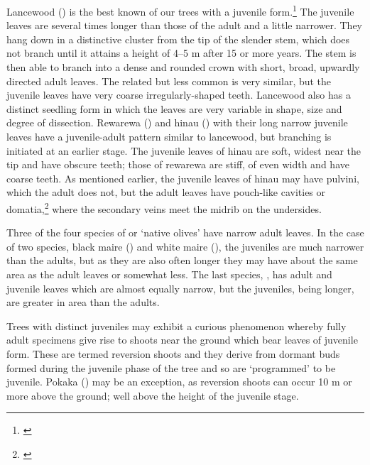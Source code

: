 Lancewood () is the best known of our trees with a juvenile form.\footnote{\cite{laing1906plants}}
The juvenile leaves are several times longer than those of the adult and a little narrower.
They hang down in a distinctive cluster from the tip of the slender stem, which does not branch until it attains a height of 4--5 m after 15 or more years.
The stem is then able to branch into a dense and rounded crown with short, broad, upwardly directed adult leaves.
The related but less common  is very similar, but the juvenile leaves have very coarse irregularly-shaped teeth.
Lancewood also has a distinct seedling form in which the leaves are very variable in shape, size and degree of dissection.
Rewarewa () and hinau () with their long narrow juvenile leaves have a juvenile-adult pattern similar to lancewood, but branching is initiated at an earlier stage.
The juvenile leaves of hinau are soft, widest near the tip and have obscure teeth; those of rewarewa are stiff, of even width and have coarse teeth.
As mentioned earlier, the juvenile leaves of hinau may have pulvini, which the adult does not, but the adult leaves have pouch-like cavities or domatia,\footnote{\cite{sampson1965domatia}} where the secondary veins meet the midrib on the undersides.

Three of the four species of  or `native olives' have narrow adult leaves.
In the case of two species, black maire () and white maire (), the juveniles are much narrower than the adults, but as they are also often longer they may have about the same area as the adult leaves or somewhat less.
The last species, , has adult and juvenile leaves which are almost equally narrow, but the juveniles, being longer, are greater in area than the adults.

Trees with distinct juveniles may exhibit a curious phenomenon whereby fully adult specimens give rise to shoots near the ground which bear leaves of juvenile form.
These are termed reversion shoots and they derive from dormant buds formed during the juvenile phase of the tree and so are `programmed' to be juvenile.
Pokaka () may be an exception, as reversion shoots can occur 10 m or more above the ground; well above the height of the juvenile stage.

